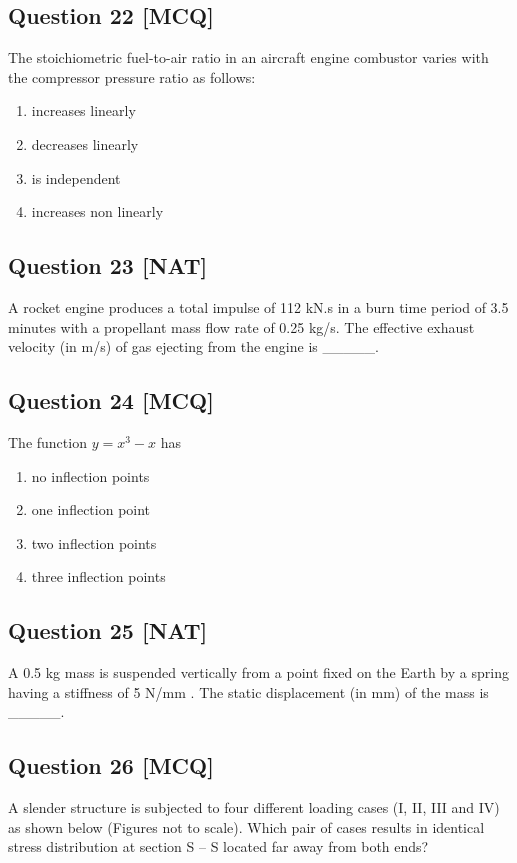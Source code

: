 \documentclass[12pt,a4paper]{article}
\begin{document}
\subsection*{Question 22 [MCQ]}
 The stoichiometric fuel-to-air ratio in an aircraft engine combustor varies with the compressor pressure ratio as follows:  
\begin{enumerate}[label=(\alph*)]
\item increases linearly 
\item decreases linearly 
\item is independent  
\item increases non linearly
\end{enumerate}



\subsection*{Question 23 [NAT]}
 A rocket engine produces a total impulse of 112 kN.s in a burn time period of 3.5 minutes with a propellant mass flow rate of 0.25 kg/s. The effective exhaust velocity (in m/s) of gas ejecting from the engine is \_\_\_\_\_.  


\subsection*{Question 24 [MCQ]}
The function \(y = x^3 - x\) has  
\begin{enumerate}[label=(\alph*)]
\item no inflection points 
\item one inflection point 
\item two inflection points  
\item three inflection points 
\end{enumerate}



\subsection*{Question 25 [NAT]}
 A 0.5 kg mass is suspended vertically from a point fixed on the Earth by a spring having a stiffness of 5 N/mm . The static displacement (in mm) of the mass is \_\_\_\_\_. 



\subsection*{Question 26 [MCQ]}
A slender structure is subjected to four different loading cases (I, II, III and IV) as shown below (Figures not to scale). Which pair of cases results in identical stress distribution at section S – S located far away from both ends? 
\end{document}
